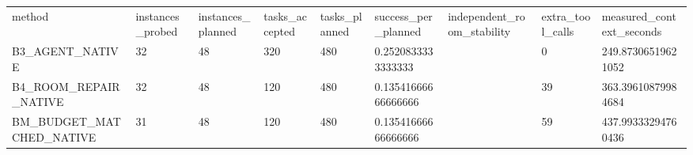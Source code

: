 \begin{tabular}{lllllllll}
method & instances\_probed & instances\_planned & tasks\_accepted & tasks\_planned & success\_per\_planned & independent\_room\_stability & extra\_tool\_calls & measured\_context\_seconds \\
B3\_AGENT\_NATIVE & 32 & 48 & 320 & 480 & 0.2520833333333333 &  & 0 & 249.87306519621052 \\
B4\_ROOM\_REPAIR\_NATIVE & 32 & 48 & 120 & 480 & 0.13541666666666666 &  & 39 & 363.39610879984684 \\
BM\_BUDGET\_MATCHED\_NATIVE & 31 & 48 & 120 & 480 & 0.13541666666666666 &  & 59 & 437.99333294760436 \\
\end{tabular}
